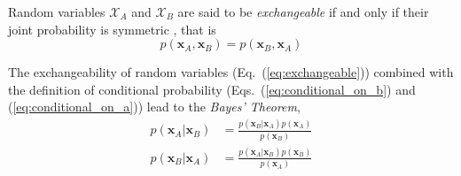 Random variables $\bm{\mathcal{X}}_A$ and $\bm{\mathcal{X}}_B$ are said to be \emph{exchangeable}
if and only if their joint probability is symmetric \cite{Greenland2005}, that is
\begin{equation}
  p(\mathbf{x}_A, \mathbf{x}_B) = p(\mathbf{x}_B, \mathbf{x}_A)
\label{eq:exchangeable}
\end{equation}

The exchangeability of random variables (Eq.~(\ref{eq:exchangeable})) combined with the definition of conditional probability (Eqs.~(\ref{eq:conditional_on_b}) and (\ref{eq:conditional_on_a})) lead to the \emph{Bayes' Theorem},
\begin{equation}
  \begin{split}
    p(\mathbf{x}_A | \mathbf{x}_B) & = \frac{p(\mathbf{x}_B | \mathbf{x}_A) p(\mathbf{x}_A)}{p(\mathbf{x}_B)} \\
    p(\mathbf{x}_B | \mathbf{x}_A) & = \frac{p(\mathbf{x}_A | \mathbf{x}_B) p(\mathbf{x}_B)}{p(\mathbf{x}_A)}
  \end{split}
\label{eq:bayes_theorem}
\end{equation}